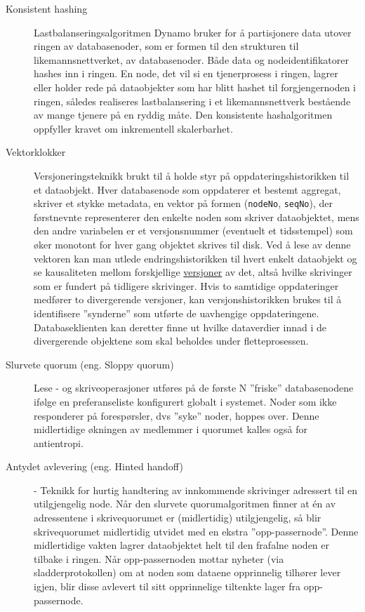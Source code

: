 \begin{description}
  \item [Konsistent hashing] Lastbalanseringsalgoritmen Dynamo bruker for å partisjonere data utover ringen av databasenoder, som er formen til den strukturen til likemannsnettverket, av databasenoder. Både data og nodeidentifikatorer hashes inn i ringen. En node, det vil si en tjenerprosess i ringen, lagrer eller holder rede på dataobjekter som har blitt hashet til forgjengernoden i ringen, således realiseres lastbalansering i et likemannsnettverk bestående av mange tjenere på en ryddig måte. Den konsistente hashalgoritmen oppfyller kravet om inkrementell skalerbarhet.
  \item [Vektorklokker] Versjoneringsteknikk brukt til å holde styr på oppdateringshistorikken til et dataobjekt. Hver databasenode som oppdaterer et bestemt aggregat, skriver et stykke metadata, en vektor på formen (\texttt{nodeNo}, \texttt{seqNo}), der førstnevnte representerer den enkelte noden som skriver dataobjektet, mens den andre variabelen er et versjonsnummer (eventuelt et tidsstempel) som øker monotont for hver gang objektet skrives til disk. Ved å lese av denne vektoren kan man utlede endringshistorikken til hvert enkelt dataobjekt og se kausaliteten mellom forskjellige \underline{versjoner} av det, altså hvilke skrivinger som er fundert på tidligere skrivinger. Hvis to samtidige oppdateringer medfører to divergerende versjoner, kan versjonshistorikken brukes til å identifisere ''synderne'' som utførte de uavhengige oppdateringene. Databaseklienten kan deretter finne ut hvilke dataverdier innad i de divergerende objektene som skal beholdes under fletteprosessen.
  \item [Slurvete quorum (eng. Sloppy quorum)] Lese - og skriveoperasjoner utføres på de første N ''friske'' databasenodene ifølge en preferanseliste konfigurert globalt i systemet. Noder som ikke responderer på forespørsler, dvs ''syke'' noder, hoppes over. Denne midlertidige økningen av medlemmer i quorumet kalles også for antientropi.
  \item [Antydet avlevering (eng. Hinted handoff)] - Teknikk for hurtig handtering av innkommende skrivinger adressert til en utilgjengelig node. Når den slurvete quorumalgoritmen finner at én av adressentene i skrivequorumet er (midlertidig) utilgjengelig, så blir skrivequorumet midlertidig utvidet med en ekstra ''opp-passernode''. Denne midlertidige vakten lagrer dataobjektet helt til den frafalne noden er tilbake i ringen. Når opp-passernoden mottar nyheter (via sladderprotokollen) om at noden som dataene opprinnelig tilhører lever igjen, blir disse avlevert til sitt opprinnelige tiltenkte lager fra opp-passernode.

\end{description}
